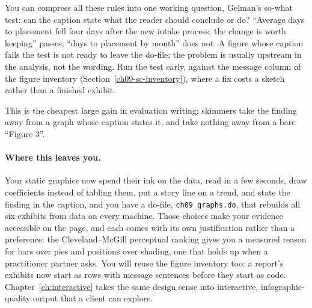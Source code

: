 \documentclass[
    a4paper,
    fontsize=10pt,
    twoside=true,
    numbers=noenddot,
]{kaobook}
\begin{document}
You can compress all these rules into one working question, Gelman's so-what test: can the caption state what the reader should conclude or do? \enquote{Average days to placement fell four days after the new intake process; the change is worth keeping} passes; \enquote{days to placement by month} does not. A figure whose caption fails the test is not ready to leave the do-file; the problem is usually upstream in the analysis, not the wording. Run the test early, against the message column of the figure inventory (Section~\ref{ch09-sc-inventory}), where a fix costs a sketch rather than a finished exhibit.

This is the cheapest large gain in evaluation writing: skimmers take the finding away from a graph whose caption states it, and take nothing away from a bare \enquote{Figure 3}.

\paragraph{Where this leaves you.} Your static graphics now spend their ink on the data, read in a few seconds, draw coefficients instead of tabling them, put a story line on a trend, and state the finding in the caption, and you have a do-file, \texttt{ch09\_graphs.do}, that rebuilds all six exhibits from data on every machine. Those choices make your evidence accessible on the page, and each comes with its own justification rather than a preference: the Cleveland--McGill perceptual ranking gives you a measured reason for bars over pies and positions over shading, one that holds up when a practitioner partner asks. You will reuse the figure inventory too: a report's exhibits now start as rows with message sentences before they start as code. Chapter~\ref{ch:interactive} takes the same design sense into interactive, infographic-quality output that a client can explore.
\end{document}
